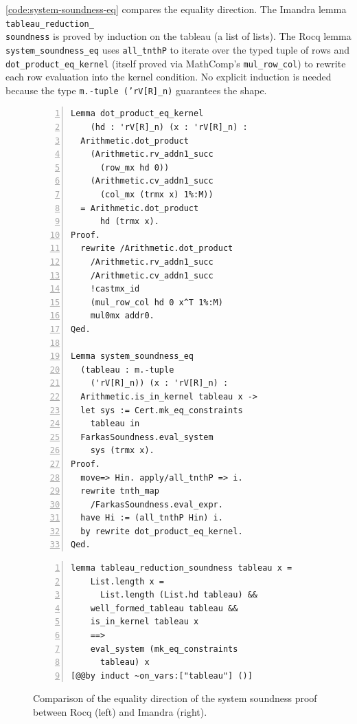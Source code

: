 \autoref{code:system-soundness-eq} compares the equality direction.  The Imandra lemma \texttt{tableau\_reduction\_\\soundness} is proved by induction on the tableau (a list of lists).  The Rocq lemma \texttt{system\_soundness\_eq} uses \texttt{all\_tnthP} to iterate over the typed tuple of rows and \texttt{dot\_product\_eq\_kernel} (itself proved via MathComp's \texttt{mul\_row\_col}) to rewrite each row evaluation into the kernel condition. No explicit induction is needed because the type \texttt{m.-tuple ('rV[R]\_n)} guarantees the shape.

\begin{figure}[h]
\begin{minipage}{0.48\textwidth}
\begin{lstlisting}[language=Coq, numbers=left, breaklines=true, basicstyle=\tiny\ttfamily]
Lemma dot_product_eq_kernel
    (hd : 'rV[R]_n) (x : 'rV[R]_n) :
  Arithmetic.dot_product
    (Arithmetic.rv_addn1_succ
      (row_mx hd 0))
    (Arithmetic.cv_addn1_succ
      (col_mx (trmx x) 1%:M))
  = Arithmetic.dot_product
      hd (trmx x).
Proof.
  rewrite /Arithmetic.dot_product
    /Arithmetic.rv_addn1_succ
    /Arithmetic.cv_addn1_succ
    !castmx_id
    (mul_row_col hd 0 x^T 1%:M)
    mul0mx addr0.
Qed.

Lemma system_soundness_eq
  (tableau : m.-tuple
    ('rV[R]_n)) (x : 'rV[R]_n) :
  Arithmetic.is_in_kernel tableau x ->
  let sys := Cert.mk_eq_constraints
    tableau in
  FarkasSoundness.eval_system
    sys (trmx x).
Proof.
  move=> Hin. apply/all_tnthP => i.
  rewrite tnth_map
    /FarkasSoundness.eval_expr.
  have Hi := (all_tnthP Hin) i.
  by rewrite dot_product_eq_kernel.
Qed.
\end{lstlisting}
\end{minipage}
\hfill
\begin{minipage}{0.48\textwidth}
\begin{lstlisting}[language=Imandra, numbers=left, breaklines=true, basicstyle=\tiny\ttfamily]
lemma tableau_reduction_soundness tableau x =
    List.length x =
      List.length (List.hd tableau) &&
    well_formed_tableau tableau &&
    is_in_kernel tableau x
    ==>
    eval_system (mk_eq_constraints
      tableau) x
[@@by induct ~on_vars:["tableau"] ()]
\end{lstlisting}
\end{minipage}
\caption{Comparison of the equality direction of the system soundness proof between Rocq (left) and Imandra (right).}
\label{code:system-soundness-eq}
\end{figure}

